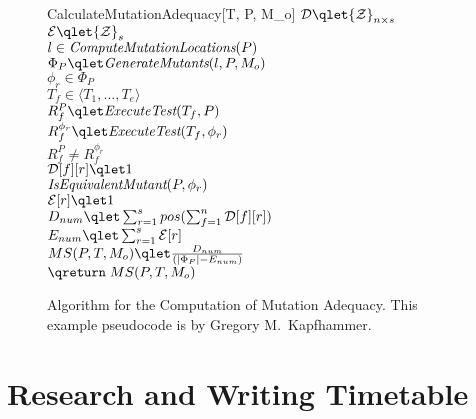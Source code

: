 \begin{figure}[t]
\begin{algorithm}{CalculateMutationAdequacy}[T, P, M_o]
{
}
${\cal D} \qlet {\cal Z}_{n \times s}$ \\
${\cal E} \qlet {\cal Z}_{s}$ \\
\qfor $l \in \mbox{\it ComputeMutationLocations}(P)$ \\
\qdo $\Phi_P \qlet \mbox{\it GenerateMutants}(l,P,M_o)$ \\
\qfor $\phi_r \in \Phi_P$ \\
\qdo \qfor $T_f \in \langle T_1, \ldots, T_e \rangle$ \\
\qdo $R_f^P \qlet \mbox{\it ExecuteTest}(T_f,P)$ \\
$R_f^{\phi_r} \qlet \mbox{\it ExecuteTest}(T_f,\phi_r)$ \\
\qif $R_f^P \neq R_f^{\phi_r}$ \\
\qdo ${\cal D}[f][r] \qlet 1$ \\
\qelse \qif ${\it \mbox{\it IsEquivalentMutant}}(P,\phi_r)$
                                                 \\ \label{equivalent}
\qdo ${\cal E}[r] \qlet 1$ \qfi \qfi \qrof \qrof \qrof \\
$D_{num} \qlet \sum_{r=1}^s pos( \sum_{f=1}^n {\cal D}[f][r] )$ \\ \label{sum1}
$E_{num} \qlet \sum_{r=1}^s {\cal E}[r] $ \\ \label{sum2}
$MS(P,T,M_o) \qlet \frac{D_{num}}{(|\Phi_P| - E_{num})}$ \\ \label{result}
$\qreturn \; MS(P,T,M_o)$
\end{algorithm}
\caption{Algorithm for the Computation of Mutation Adequacy.  This example
pseudocode is by Gregory M.\ Kapfhammer.}
\label{fig:mutation_adequacy}
\end{figure}

\section{Research and Writing Timetable}\label{sec:timetable}

